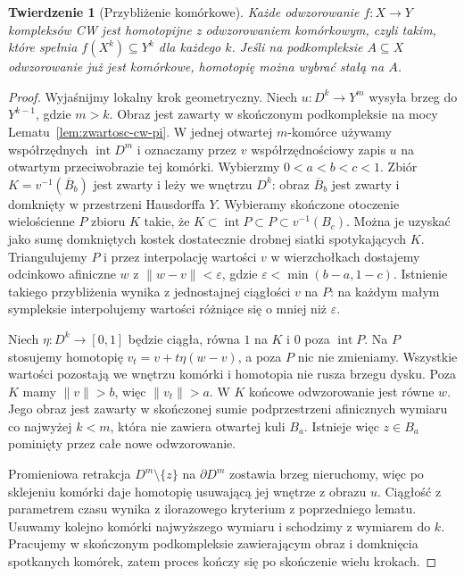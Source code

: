\documentclass[11pt,a4paper,oneside]{report}
\theoremstyle{plain}
\newtheorem{twierdzenie}{Twierdzenie}[section]
\theoremstyle{definition}
\theoremstyle{remark}
\begin{document}
\begin{twierdzenie}[Przybliżenie komórkowe]
\label{thm:przyblizenie-komorkowe}
Każde odwzorowanie $f:X\to Y$ kompleksów CW
jest homotopijne z odwzorowaniem
\emph{komórkowym}, czyli takim,
które spełnia
$f(X^k)\subseteq Y^k$ dla
każdego $k$. Jeśli na
podkompleksie $A\subseteq X$
odwzorowanie już jest komórkowe,
homotopię można wybrać
stałą na $A$.
\end{twierdzenie}
\begin{proof}
Wyjaśnijmy lokalny krok geometryczny. Niech
$u:D^k\to Y^m$ wysyła brzeg do $Y^{k-1}$, gdzie $m>k$.
Obraz jest zawarty w skończonym podkompleksie na mocy
Lematu~\ref{lem:zwartosc-cw-pi}. W jednej otwartej $m$-komórce
używamy współrzędnych $\operatorname{int}D^m$ i oznaczamy przez $v$
współrzędnościowy zapis $u$ na otwartym przeciwobrazie tej komórki.
Wybierzmy $0<a<b<c<1$. Zbiór $K=v^{-1}(\overline B_b)$
jest zwarty i leży we wnętrzu $D^k$: obraz $\overline B_b$
jest zwarty i domknięty w przestrzeni Hausdorffa $Y$.
Wybieramy skończone otoczenie wielościenne $P$ zbioru $K$
takie, że $K\subset\operatorname{int}P\subset P\subset v^{-1}(B_c)$.
Można je uzyskać jako sumę domkniętych kostek dostatecznie drobnej siatki
spotykających $K$. Triangulujemy $P$ i przez interpolację wartości $v$
w wierzchołkach dostajemy odcinkowo afiniczne $w$ z
$\|w-v\|<\varepsilon$, gdzie $\varepsilon<\min(b-a,1-c)$.
Istnienie takiego przybliżenia wynika z jednostajnej ciągłości $v$ na $P$:
na każdym małym sympleksie interpolujemy wartości różniące się o mniej niż $\varepsilon$.

Niech $\eta:D^k\to[0,1]$ będzie ciągła, równa $1$ na $K$
i $0$ poza $\operatorname{int}P$. Na $P$ stosujemy homotopię
$v_t=v+t\eta(w-v)$, a poza $P$ nic nie zmieniamy.
Wszystkie wartości pozostają we wnętrzu komórki i homotopia nie rusza brzegu dysku.
Poza $K$ mamy $\|v\|>b$, więc $\|v_t\|>a$.
W $K$ końcowe odwzorowanie jest równe $w$.
Jego obraz jest zawarty w skończonej sumie podprzestrzeni afinicznych
wymiaru co najwyżej $k<m$, która nie zawiera otwartej kuli $B_a$.
Istnieje więc $z\in B_a$ pominięty przez całe nowe odwzorowanie.

Promieniowa retrakcja $D^m\setminus\{z\}$ na $\partial D^m$
zostawia brzeg nieruchomy, więc po sklejeniu komórki daje homotopię
usuwającą jej wnętrze z obrazu $u$. Ciągłość z parametrem czasu
wynika z ilorazowego kryterium z poprzedniego lematu.
Usuwamy kolejno komórki najwyższego wymiaru i schodzimy z wymiarem do $k$.
Pracujemy w skończonym podkompleksie zawierającym obraz i domknięcia
spotkanych komórek, zatem proces kończy się po skończenie wielu krokach.


\end{proof}
\end{document}
